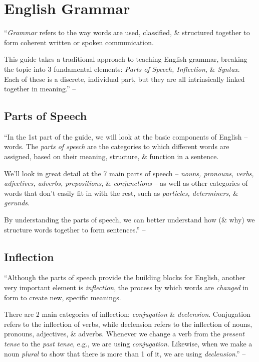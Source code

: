 \documentclass{article}
\numberwithin{equation}{section}
\begin{document}

\section{English Grammar}
``\textit{Grammar} refers to the way words are used, classified, \& structured together to form coherent written or spoken communication.

This guide takes a traditional approach to teaching English grammar, breaking the topic into 3 fundamental elements: \textit{Parts of Speech, Inflection}, \& \textit{Syntax}. Each of these is a discrete, individual part, but they are all intrinsically linked together in meaning.'' -- \cite[p. 11]{Herring2016}

\subsection{Parts of Speech}
``In the 1st part of the guide, we will look at the basic components of English -- words. The \textit{parts of speech} are the categories to which different words are assigned, based on their meaning, structure, \& function in a sentence.

We'll look in great detail at the 7 main parts of speech -- \textit{nouns, pronouns, verbs, adjectives, adverbs, prepositions}, \& \textit{conjunctions} -- as well as other categories of words that don't easily fit in with the rest, such as \textit{particles, determiners}, \& \textit{gerunds}.

By understanding the parts of speech, we can better understand how (\& why) we structure words together to form sentences.'' -- \cite[p. 11]{Herring2016}

\subsection{Inflection}
``Although the parts of speech provide the building blocks for English, another very important element is \textit{inflection}, the process by which words are \textit{changed} in form to create new, specific meanings.

There are 2 main categories of inflection: \textit{conjugation} \& \textit{declension}. Conjugation refers to the inflection of verbs, while declension refers to the inflection of nouns, pronouns, adjectives, \& adverbs. Whenever we change a verb from the \textit{present tense} to the \textit{past tense}, e.g., we are using \textit{conjugation}. Likewise, when we make a noun \textit{plural} to show that there is more than 1 of it, we are using \textit{declension}.'' -- \cite[p. 11]{Herring2016}
\end{document}
